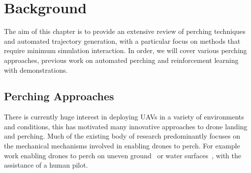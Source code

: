 \chapter{Background}


The aim of this chapter is to provide an extensive review of perching techniques and automated trajectory generation, with a particular focus on methods that require minimum simulation interaction.
In order, we will cover various perching approaches, previous work on automated perching and reinforcement learning with demonstrations.
\section{Perching Approaches}


There is currently huge interest in deploying UAVs in a variety of environments and conditions, this has motivated many innovative approaches to drone landing and perching.
Much of the existing body of research predominantly focuses on the mechanical mechanisms involved in enabling drones to perch.
For example work enabling drones to perch on uneven ground~\cite{perching-uneven-ground} or water surfaces~\cite{perching-water1,perching-water2}, with the assistance of a human pilot.

